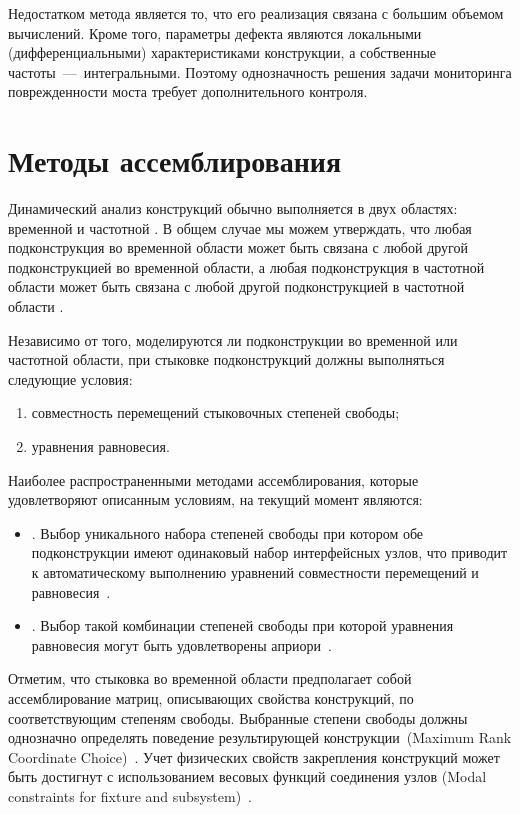 Недостатком метода является то, что его реализация связана с большим объемом вычислений. Кроме того, параметры дефекта являются локальными (дифференциальными) характеристиками конструкции, а собственные частоты~---~интегральными. Поэтому однозначность решения задачи мониторинга поврежденности моста требует дополнительного контроля. 

\section{Методы ассемблирования}

Динамический анализ конструкций обычно выполняется в двух областях: временной \cite{lib:coupling:Dong&Shuo, lib:coupling:Gram-Schmidt} и частотной \cite{lib:coupling:Peeters}. В общем случае мы можем утверждать, что любая подконструкция во временной области может быть связана с любой другой подконструкцией во временной области, а любая подконструкция в частотной области может быть связана с любой другой подконструкцией в частотной области \cite{lib:coupling:Valk}. 

Независимо от того, моделируются ли подконструкции во временной или частотной области, при стыковке подконструкций должны выполняться следующие условия:
\begin{enumerate}[noitemsep]
	\item совместность перемещений стыковочных степеней свободы;
	\item уравнения равновесия. 
\end{enumerate}

Наиболее распространенными методами ассемблирования, которые удовлетворяют описанным условиям, на текущий момент являются:
\begin{itemize}
	\item {}. Выбор уникального набора степеней свободы при котором обе подконструкции имеют одинаковый набор интерфейсных узлов, что приводит к автоматическому выполнению уравнений совместности перемещений и равновесия~\cite{lib:coupling:Fregolent}.
	\item {}. Выбор такой комбинации степеней свободы при которой уравнения равновесия  могут быть удовлетворены априори~\cite{lib:coupling:DAmbrogio}.
\end{itemize}

Отметим, что стыковка во временной области предполагает собой ассемблирование матриц, описывающих свойства конструкций, по соответствующим степеням свободы. Выбранные степени свободы должны однозначно определять поведение результирующей конструкции~(Maximum Rank Coordinate Choice)~\cite{lib:coupling:Allen&Mayes}. Учет физических свойств закрепления конструкций может быть достигнут с использованием весовых функций соединения узлов (Modal constraints for fixture and subsystem)~\cite{lib:coupling:Allen}. 

